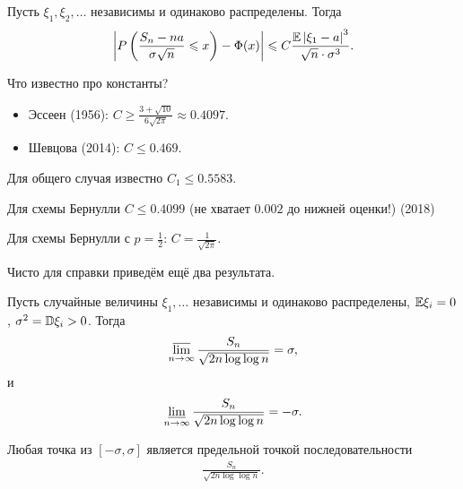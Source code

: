 \documentclass[../main.tex]{subfiles}
\begin{document}
\begin{thm}
 Пусть $ \xi_1, \xi_2, \ldots $ независимы и одинаково распределены.  Тогда
 \begin{align*}
  \left| P \left( \frac{S_n - na}{\sigma \sqrt n} \leqslant x \right) - \Phi(x) \right| \leqslant C \frac{\mathbb E \left| \xi_1 - a \right|^{3}}{\sqrt n \cdot \sigma^{3}}.
 \end{align*}
\end{thm}

Что известно про константы?

\begin{itemize}
 \item Эссеен (1956): $ C \geqslant \frac{3 + \sqrt{10}}{6 \sqrt{2\pi}} \approx 0.4097 $.
 \item Шевцова (2014): $ C \leqslant 0.469 $.
\end{itemize}

Для общего случая известно $ C_1 \leqslant 0.5583 $.

Для схемы Бернулли $ C \leqslant 0.4099 $ (не хватает $ 0.002 $ до нижней оценки!) (2018)

Для схемы Бернулли  с $ p = \frac{1}{2} $: $ C = \frac{1}{\sqrt{2\pi}} $.

Чисто для справки приведём ещё два результата.

\begin{thm}
 Пусть случайные величины $ \xi_1, \ldots $ независимы и одинаково распределены, $ \mathbb E \xi_i = 0 $, $ \sigma^{2} = \mathbb D \xi_i > 0 $. Тогда
 \begin{align*}
  \varlimsup_{n \to \infty} \frac{S_n}{\sqrt{2n \log\log n}} = \sigma,
 \end{align*} и
 \begin{align*}
  \varliminf_{n \to \infty} \frac{S_n}{\sqrt{2n \log\log n}} = -\sigma.
 \end{align*}
\end{thm}

\begin{thm}[Штрассена]
 Любая точка из $ [-\sigma, \sigma] $ является предельной точкой последовательности
 \begin{align*}
  \frac{S_n}{\sqrt{2 n \log \log n}}.
 \end{align*}
\end{thm}
\end{document}
